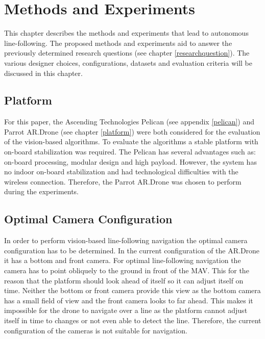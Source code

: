 \documentclass[a4paper]{article}
\begin{document}
\section{Methods and Experiments}
This chapter describes the methods and experiments that lead to autonomous line-following. The proposed methods and experiments aid to answer the previously determined research questions (see chapter \ref{researchquestion}). The various designer choices, configurations, datasets and evaluation criteria will be discussed in this chapter.

\subsection{Platform}
For this paper, the Ascending Technologies Pelican (see appendix \ref{pelican}) and Parrot AR.Drone (see chapter \ref{platform}) were both considered for the evaluation of the vision-based algorithms. To evaluate the algorithms a stable platform with on-board stabilization was required. The Pelican has several advantages such as: on-board processing, modular design and high payload. However, the system has no indoor on-board stabilization and had technological difficulties with the wireless connection. Therefore, the Parrot AR.Drone was chosen to perform during the experiments.

\subsection{Optimal Camera Configuration}
In order to perform vision-based line-following navigation the optimal camera configuration has to be determined. In the current configuration of the AR.Drone it has a bottom and front camera. For optimal line-following navigation the camera has to point obliquely to the ground in front of the MAV. This for the reason that the platform should look ahead of itself so it can adjust itself on time. Neither the bottom or front camera provide this view as the bottom camera has a small field of view and the front camera looks to far ahead. This makes it impossible for the drone to navigate over a line as the platform cannot adjust itself in time to changes or not even able to detect the line. Therefore, the current configuration of the cameras is not suitable for navigation.
\end{document}
